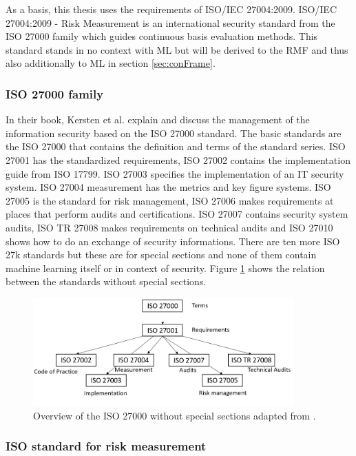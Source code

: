 As a basis, this thesis uses the requirements of ISO/IEC 27004:2009. ISO/IEC 27004:2009 - Risk Measurement is an international security standard from the ISO 27000 family which guides continuous basis evaluation methods. This standard stands in no context with ML but will be derived to the RMF and thus also additionally to ML in section \ref{sec:conFrame}.

\subsubsection*{ISO 27000 family}

In their book, Kersten et al. \cite{kersten_reuter_schroeder_wolfenstetter_2013} explain and discuss the management of the information security based on the ISO 27000 standard. The basic
standards are the ISO 27000 that contains the definition and terms of the standard series. ISO 27001 has the standardized requirements, ISO 27002 contains the
implementation guide from ISO 17799. ISO 27003 specifies the implementation of an IT security system. ISO 27004 measurement has the metrics and key figure systems. ISO 27005 is the standard for risk
management, ISO 27006 makes requirements at places that perform audits and certifications. ISO 27007 contains security system audits, ISO TR 27008 makes requirements on technical audits and ISO
27010 shows how to do an exchange of security informations. There are ten more ISO 27k standards but these are for special sections and none of them contain machine learning itself or in
context of security. Figure \ref{fig:standard_relations} shows
the relation between the standards without special sections.

\begin{figure}[ht!]
  \centering
  \includegraphics[width=10cm]{pictures/standard_relations.jpg}
  \caption{Overview of the ISO 27000 without special sections adapted from \cite{kersten_reuter_schroeder_wolfenstetter_2013}.}
  \label{fig:standard_relations}
\end{figure}


\subsubsection*{ISO standard for risk measurement}

